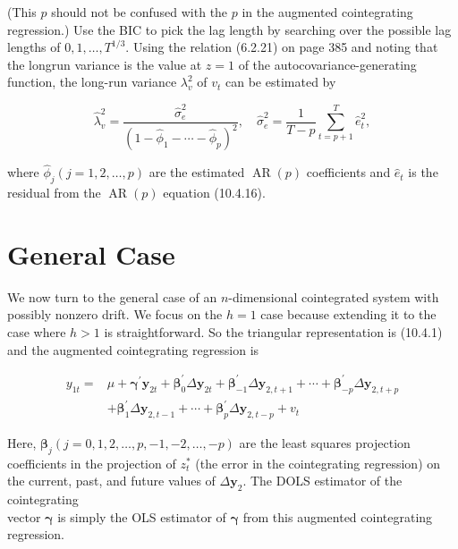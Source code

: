 \documentclass[10pt]{article}
\begin{document}
(This $p$ should not be confused with the $p$ in the augmented cointegrating regression.) Use the BIC to pick the lag length by searching over the possible lag lengths of $0,1, \ldots, T^{1 / 3}$. Using the relation (6.2.21) on page 385 and noting that the longrun variance is the value at $z=1$ of the autocovariance-generating function, the long-run variance $\lambda_{v}^{2}$ of $v_{t}$ can be estimated by


\begin{equation*}
\hat{\lambda}_{v}^{2}=\frac{\hat{\sigma}_{e}^{2}}{\left(1-\hat{\phi}_{1}-\cdots-\hat{\phi}_{p}\right)^{2}}, \quad \hat{\sigma}_{e}^{2}=\frac{1}{T-p} \sum_{t=p+1}^{T} \hat{e}_{t}^{2}, \tag{10.4.17}
\end{equation*}


where $\hat{\phi}_{j}(j=1,2, \ldots, p)$ are the estimated $\operatorname{AR}(p)$ coefficients and $\hat{e}_{t}$ is the residual from the $\operatorname{AR}(p)$ equation (10.4.16).

\section*{General Case}
We now turn to the general case of an $n$-dimensional cointegrated system with possibly nonzero drift. We focus on the $h=1$ case because extending it to the case where $h>1$ is straightforward. So the triangular representation is (10.4.1) and the augmented cointegrating regression is


\begin{align*}
y_{1 t}= & \mu+\boldsymbol{\gamma}^{\prime} \mathbf{y}_{2 t}+\boldsymbol{\beta}_{0}^{\prime} \Delta \mathbf{y}_{2 t}+\boldsymbol{\beta}_{-1}^{\prime} \Delta \mathbf{y}_{2, t+1}+\cdots+\boldsymbol{\beta}_{-p}^{\prime} \Delta \mathbf{y}_{2, t+p} \\
& +\boldsymbol{\beta}_{1}^{\prime} \Delta \mathbf{y}_{2, t-1}+\cdots+\boldsymbol{\beta}_{p}^{\prime} \Delta \mathbf{y}_{2, t-p}+v_{t} \tag{10.4.18}
\end{align*}


Here, $\boldsymbol{\beta}_{j}(j=0,1,2, \ldots, p,-1,-2, \ldots,-p)$ are the least squares projection coefficients in the projection of $z_{t}^{*}$ (the error in the cointegrating regression) on the current, past, and future values of $\Delta \mathbf{y}_{2}$. The DOLS estimator of the cointegrating\\
vector $\boldsymbol{\gamma}$ is simply the OLS estimator of $\boldsymbol{\gamma}$ from this augmented cointegrating regression.
\end{document}
